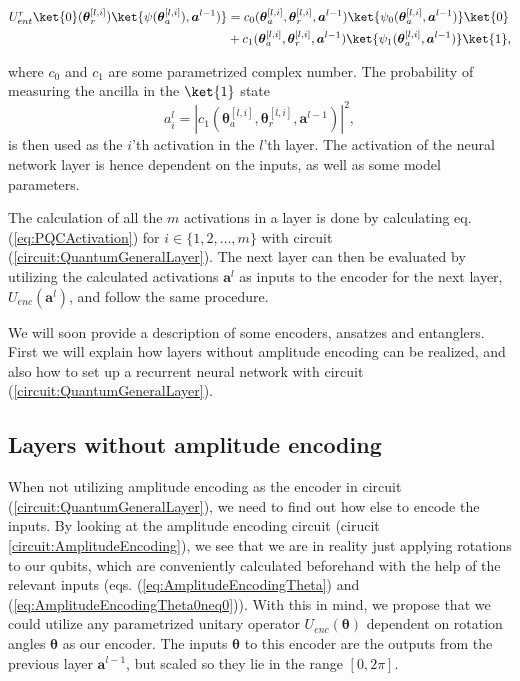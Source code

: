 \begin{align*}
    U^r_{ent}\ket{0}(\boldsymbol{\theta}^{[l,i]}_r)\ket{\psi (\boldsymbol{\theta}^{[l,i]}_a),\boldsymbol{a}^{l-1})} &= c_0(\boldsymbol{\theta}^{[l,i]}_a,\boldsymbol{\theta}^{[l,i]}_r ,\boldsymbol{a}^{l-1})\ket{\psi_0 (\boldsymbol{\theta}^{[l,i]}_a,\boldsymbol{a}^{l-1})}\ket{0} \\
    &+ c_1(\boldsymbol{\theta}^{[l,i]}_a,\boldsymbol{\theta}^{[l,i]}_r ,\boldsymbol{a}^{l-1}) \ket{\psi_1 (\boldsymbol{\theta}^{[l,i]}_a,\boldsymbol{a}^{l-1})}\ket{1},
\end{align*}


where $c_0$ and $c_1$ are some parametrized complex number.
The probability of measuring the ancilla in the $\ket{1}$ state
\begin{equation}
    \label{eq:PQCActivation}
    a_i^l = |c_1(\boldsymbol{\theta}^{[l,i]}_a,\boldsymbol{\theta}^{[l,i]}_r ,\boldsymbol{a}^{l-1})|^2,
\end{equation}
is then used as the $i$'th activation in the $l$'th layer. The activation of the neural network layer is hence dependent on the inputs, as well as some model parameters.

The calculation of all the $m$ activations in a layer is done by calculating eq. (\ref{eq:PQCActivation}) for $i\in\{1,2,\dots,m\}$ with circuit (\ref{circuit:QuantumGeneralLayer}). The next layer can then be evaluated by utilizing the calculated activations $\boldsymbol{a}^l$ as inputs to the encoder for the next layer, $U_{enc}(\boldsymbol{a}^l)$, and follow the same procedure.

We will soon provide a description of some encoders, ansatzes and entanglers. First we will explain how layers without amplitude encoding can be realized, and also how to set up a recurrent neural network with circuit (\ref{circuit:QuantumGeneralLayer}).


\subsection{Layers without amplitude encoding}
\label{sec:IntermediateLayers}
When not utilizing amplitude encoding as the encoder in circuit (\ref{circuit:QuantumGeneralLayer}), we need to find out how else to encode the inputs. By looking at the amplitude encoding circuit (cirucit \ref{circuit:AmplitudeEncoding}), we see that we are in reality just applying rotations to our qubits, which are conveniently calculated beforehand with the help of the relevant inputs (eqs. (\ref{eq:AmplitudeEncodingTheta}) and (\ref{eq:AmplitudeEncodingTheta0neq0})). With this in mind, we propose that we could utilize any parametrized unitary operator $U_{enc}(\boldsymbol{\theta})$ dependent on rotation angles $\boldsymbol{\theta}$ as our encoder. The inputs $\boldsymbol{\theta}$ to this encoder are the outputs from the previous layer $\boldsymbol{a}
^{l-1}$, but scaled so they lie in the range $[0,2\pi]$.


